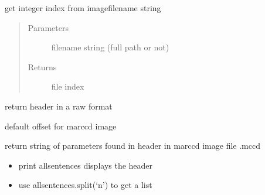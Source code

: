 \documentclass[letterpaper,10pt,english]{sphinxmanual}
\begin{document}

\begin{fulllineitems}
\label{\detokenize{PeakSearch:LaueTools.readmccd.getIndex_fromfilename}}
get integer index from imagefilename string
\begin{quote}\begin{description}
\item[{Parameters}] \leavevmode
{} \textendash{} filename string (full path or not)

\item[{Returns}] \leavevmode
file index

\end{description}\end{quote}

\end{fulllineitems}


\begin{fulllineitems}
\label{\detokenize{PeakSearch:LaueTools.readmccd.readheader}}
return header in a raw format

default offset for marccd image

\end{fulllineitems}


\begin{fulllineitems}
\label{\detokenize{PeakSearch:LaueTools.readmccd.read_header_marccd}}
return string of parameters found in header in marccd image file .mccd
\begin{itemize}
\item {} 
print allsentences  displays the header

\item {} 
use allsentences.split(‘n’) to get a list

\end{itemize}

\end{fulllineitems}
\end{document}
